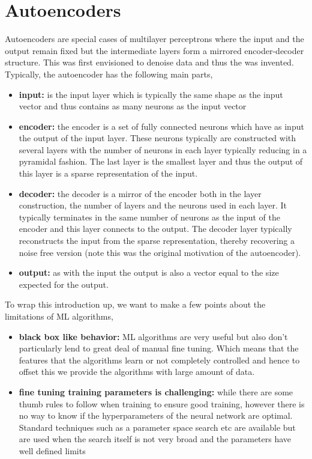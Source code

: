 \section{Autoencoders}
Autoencoders are special cases of multilayer perceptrons where the input and the output remain fixed but the intermediate layers form a mirrored encoder-decoder structure.
This was first envisioned to denoise data and thus the \citep[denoising autoencoder, ][]{vincent2011connection} was invented.
Typically, the autoencoder has the following main parts,
\begin{itemize}
    \item \textbf{input:} is the input layer which is typically the same shape as the input vector and thus contains as many neurons as the input vector
    \item\textbf{encoder:} the encoder is a set of fully connected neurons which have as input the output of the input layer. 
    These neurons typically are constructed with several layers with the number of neurons in each layer typically reducing in a pyramidal fashion.
    The last layer is the smallest layer and thus the output of this layer is a sparse representation of the input.
    \item\textbf{decoder: } the decoder is a mirror of the encoder both in the layer construction, the number of layers and the neurons used in each layer. 
    It typically terminates in the same number of neurons as the input of the encoder and this layer connects to the output.
    The decoder layer typically reconstructs the input from the sparse representation, thereby recovering a noise free version (note this was the original motivation of the autoencoder).
    \item \textbf{output:} as with the input the output is also a vector equal to the size expected for the output.
\end{itemize}

To wrap this introduction up, we want to make a few points about the limitations of ML algorithms,
\begin{itemize}
    \item \textbf{black box like behavior:} ML algorithms are very useful but also don't particularly lend to great deal of manual fine tuning. 
    Which means that the features that the algorithms learn or not completely controlled and hence to offset this we provide the algorithms with large amount of data.
    \item{\textbf{fine tuning training parameters is challenging:} while there are some thumb rules to follow when training to ensure good training, however there is no way to know if the hyperparameters of the neural network are optimal. 
    Standard techniques such as a parameter space search etc are available but are used when the search itself is not very broad and the parameters have well defined limits}
\end{itemize}

